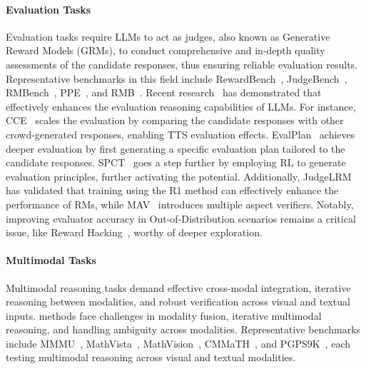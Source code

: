 \paragraph{Evaluation Tasks}

Evaluation tasks require LLMs to act as judges, also known as Generative Reward Models (GRMs), to conduct comprehensive and in-depth quality assessments of the candidate responses, thus ensuring reliable evaluation results. Representative benchmarks in this field include RewardBench~\citep{lambert2024rewardbenchevaluatingrewardmodels}, JudgeBench~\citep{tan2025judgebenchbenchmarkevaluatingllmbased}, RMBench~\citep{liu2024rmbenchbenchmarkingrewardmodels}, PPE~\citep{frick2024evaluaterewardmodelsrlhf}, and RMB~\citep{zhou2025rmbcomprehensivelybenchmarkingreward}. Recent research~\citep{kim2025scalingevaluationtimecomputereasoning} has demonstrated that \TTS effectively enhances the evaluation reasoning capabilities of LLMs. For instance, CCE~\citep{zhang2025crowd} scales the evaluation by comparing the candidate responses with other crowd-generated responses, enabling TTS evaluation effects. EvalPlan~\citep{saha2025learningplanreason} achieves deeper evaluation by first generating a specific evaluation plan tailored to the candidate responses. SPCT~\citep{liu2025inferencetimescalinggeneralistreward} goes a step further by employing RL to generate evaluation principles, further activating the \TTS potential. Additionally, JudgeLRM~\citep{chen2025judgelrmlargereasoningmodels} has validated that training using the R1 method can effectively enhance the performance of RMs, while MAV~\citep{lifshitz2025multiagent} introduces multiple aspect verifiers.  Notably, improving evaluator accuracy in Out-of-Distribution scenarios remains a critical issue, like Reward Hacking~\citep{skalse2025definingcharacterizingrewardhacking,shen2025exploringdatascalingtrends}, worthy of deeper exploration. 


\paragraph{Multimodal Tasks}
Multimodal reasoning tasks demand effective cross-modal integration, iterative reasoning between modalities, and robust verification across visual and textual inputs. \TTS methods face challenges in modality fusion, iterative multimodal reasoning, and handling ambiguity across modalities. Representative benchmarks include MMMU~\citep{yue2024mmmu}, MathVista~\citep{lu2024mathvista}, MathVision~\citep{wang2024measuring}, CMMaTH~\citep{li2025cmmath}, and PGPS9K~\citep{zhang2023multimodalneuralgeometricsolver}, each testing multimodal reasoning across visual and textual modalities.





